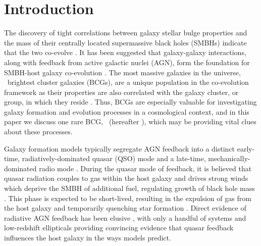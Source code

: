 \documentclass[useAMS,usenatbib]{mn2e}
\begin{document}
\section{Introduction}
\label{sec:intro}

The discovery of tight correlations between galaxy stellar bulge
properties and the mass of their centrally located supermassive black
holes (SMBHs) indicate that the two co-evolve
\citep[\eg][]{1995ARA&A..33..581K, magorrian, 2000ApJ...539L...9F,
  2000ApJ...539L..13G, 2001ApJ...563L..11G}. It has been suggested
that galaxy-galaxy interactions, along with feedback from active
galactic nuclei (AGN), form the foundation for SMBH-host galaxy
co-evolution \citep[\eg][]{1995MNRAS.276..663B, 1998A&A...331L...1S,
  2000MNRAS.311..576K, 2001MNRAS.324..757G}. The most massive galaxies
in the universe, \eg\ brightest cluster galaxies (BCGs), are a unique
population in the co-evolution framework as their properties are also
correlated with the galaxy cluster, or group, in which they reside
\citep[\eg][]{1984ApJ...276...38J, 1998ApJ...502..141D}. Thus, BCGs
are especially valuable for investigating galaxy formation and
evolution processes in a cosmological context, and in this paper we
discuss one rare BCG, \inine\ (hereafter \irs), which may be providing
vital clues about these processes.

Galaxy formation models typically segregate AGN feedback into a
distinct early-time, radiatively-dominated quasar (QSO) mode
\citep[\eg][]{2005Natur.435..629S, 2006ApJS..163....1H} and a
late-time, mechanically-dominated radio mode \citep[\eg][]{croton06,
  bower06}. During the quasar mode of feedback, it is believed that
quasar radiation couples to gas within the host galaxy and drives
strong winds which deprive the SMBH of additional fuel, regulating
growth of black hole mass \citep[\eg][]{2005ApJ...630..705H,
  2005Natur.433..604D}. This phase is expected to be short-lived,
resulting in the expulsion of gas from the host galaxy and temporarily
quenching star formation \citep[\eg][]{2006ApJ...642L.107N,
  2008ApJ...686..219M}. Direct evidence of radiative AGN feedback has
been elusive \citep[see][for a review]{2005ARA&A..43..769V}, with only
a handful of systems \citep[\eg][]{2008A&A...492...81P,
  2010A&A...518L.155F} and low-redshift ellipticals
\citep{2009ApJ...690.1672S} providing convincing evidence that quasar
feedback influences the host galaxy in the ways models predict.
\end{document}
